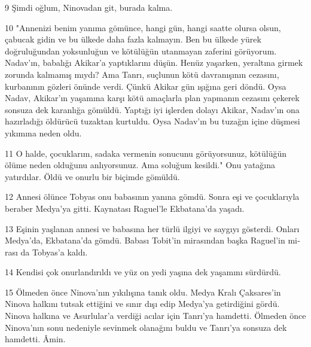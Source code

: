 \par 9 Şimdi oğlum, Ninovadan git, burada kalma.
\par 10 "Annenizi benim yanıma gö­münce, hangi gün, hangi saatte olursa olsun, çabucak gidin ve bu ülkede da­ha fazla kalmayın. Ben bu ülkede yü­rek doğruluğundan yoksunluğun ve kötülüğün utanmayan zaferini görü­yorum. Nadav'ın, babalığı Akikar'a yaptıklarını düşün. Henüz yaşarken, yeraltına girmek zorunda kalmamış mıydı? Ama Tanrı, suçlunun kötü davranışının cezasını, kurbanının göz­leri önünde verdi. Çünkü Akikar gün ışığına geri döndü. Oysa Nadav, Akikar'ın yaşamına karşı kötü amaçlarla plan yapmanın cezasını çekerek son­suza dek karanlığa gömüldü. Yaptığı iyi işlerden dolayı Akikar, Nadav'ın ona hazırladığı öldürücü tuzaktan kurtuldu. Oysa Nadav'ın bu tuzağın içine düşmesi yıkımına neden oldu.
\par 11 O halde, çocuklarım, sadaka verme­nin sonucunu görüyorsunuz, kötülüğün ölüme neden olduğunu anlıyorsu­nuz. Ama soluğum kesildi." Onu yatağına yatırdılar. Öldü ve onurlu bir biçimde gömüldü.
\par 12 Anne­si ölünce Tobyas onu babasının yanı­na gömdü. Sonra eşi ve çocuklarıyla beraber Medya'ya gitti. Kaynatası Raguel'le Ekbatana'da yaşadı.
\par 13 Eşinin yaşlanan annesi ve babasına her türlü ilgiyi ve saygıyı gösterdi. Onları Medya'da, Ekbatana'da gömdü. Babası Tobit'in mirasından başka Raguel'in mi­rası da Tobyas'a kaldı.
\par 14 Kendisi çok onurlandırıldı ve yüz on yedi yaşına dek yaşamını sürdürdü.
\par 15 Ölmeden önce Ninova'nın yıkılışına tanık oldu. Medya Kralı Çaksares'in Ninova hal­kını tutsak ettiğini ve sınır dışı edip Medya'ya getirdiğini gördü. Ninova halkına ve Asurlular'a verdiği acılar için Tanrı'ya hamdetti. Ölmeden önce Ninova'nın sonu nedeniyle sevinmek olanağını buldu ve Tanrı'ya sonsuza dek hamdetti. Âmin.




